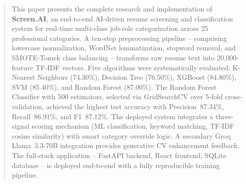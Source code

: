 \documentclass[10pt,twocolumn]{article}
\begin{document}


\begin{abstract}
This paper presents the complete research and implementation of \textbf{Screen.AI}, an end-to-end AI-driven resume screening and classification system for real-time multi-class job-role categorization across 25 professional categories. A ten-step preprocessing pipeline -- comprising lowercase normalization, WordNet lemmatization, stopword removal, and SMOTE-Tomek class balancing -- transforms raw resume text into 20{,}000-feature TF-IDF vectors. Five algorithms were systematically evaluated: K-Nearest Neighbors (74.30\%), Decision Tree (76.50\%), XGBoost (84.80\%), SVM (85.40\%), and Random Forest (87.00\%). The Random Forest Classifier with 500 estimators, selected via GridSearchCV over 5-fold cross-validation, achieved the highest test accuracy with Precision~87.34\%, Recall~86.91\%, and F1~87.12\%. The deployed system integrates a three-signal scoring mechanism (ML classification, keyword matching, TF-IDF cosine similarity) with smart category override logic. A secondary Groq Llama~3.3-70B integration provides generative CV enhancement feedback. The full-stack application -- FastAPI backend, React frontend, SQLite database -- is deployed end-to-end with a fully reproducible training pipeline.
\end{abstract}
\end{document}
